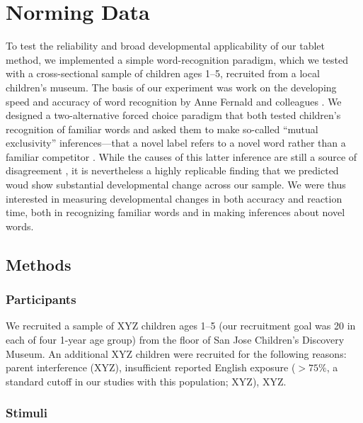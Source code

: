 \documentclass[man,noapacite]{apa2}
\begin{document}
\section{Norming Data}
 
To test the reliability and broad developmental applicability of our tablet method, we implemented a simple word-recognition paradigm, which we tested with a cross-sectional sample of children ages 1--5, recruited from a local children's museum. The basis of our experiment was work on the developing speed and accuracy of word recognition by Anne Fernald and colleagues \cite{fernald1998,fernald2002,bion2012}. We designed a two-alternative forced choice paradigm that both tested children's recognition of familiar words and asked them to make so-called ``mutual exclusivity'' inferences---that a novel label refers to a novel word rather than a familiar competitor \cite{markman1989}. While the causes of this latter inference are still a source of disagreement \cite{markman2003,diesendruck2003,frank2009,bion2012}, it is nevertheless a highly replicable finding that we predicted woud show substantial developmental change across our sample.  We were thus interested in measuring developmental changes in both accuracy and reaction time, both in recognizing familiar words and in making inferences about novel words. 

\subsection{Methods}

\subsubsection{Participants} 

We recruited a sample of XYZ children ages 1--5 (our recruitment goal was 20 in each of four 1-year age group) from the floor of San Jose Children's Discovery Museum. An additional XYZ children were recruited for the following reasons: parent interference (XYZ), insufficient reported English exposure ($>75\%$, a standard cutoff in our studies with this population; XYZ), XYZ. 

\subsubsection{Stimuli}
\end{document}
